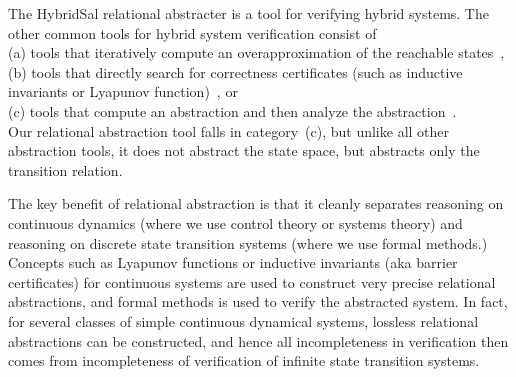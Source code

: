 \documentclass{llncs}
\begin{document}
The HybridSal relational abstracter is a tool for verifying
hybrid systems.  The other common tools for hybrid
system verification consist of 
\\
(a) tools that iteratively compute
an overapproximation of the reachable states~\cite{SpaceExsmall},
\\
(b) tools that directly search for correctness certificates
(such as inductive invariants or Lyapunov function)~\cite{sostools,ST11:ISSACsmall},
or
\\
(c) tools that compute an abstraction and then analyze
the abstraction~\cite{HybridSALsmall,AlurDangIvancic03:TACASsmall,Clarke03:TACASsmall}.
\\
Our relational abstraction tool falls in category~(c), but unlike all
other abstraction tools, it does
not abstract the state space, but abstracts only the transition relation.
 
The key benefit of relational abstraction
is that it cleanly separates reasoning on continuous
dynamics (where we use control theory or systems theory)
and
reasoning on discrete state transition systems (where we use 
formal methods.)
Concepts such as Lyapunov functions or inductive invariants
(aka barrier certificates) for continuous systems are used
to construct very precise relational abstractions, and
formal methods is used to verify the abstracted system.
In fact, for several classes of simple continuous dynamical systems, 
lossless relational abstractions can be constructed, and hence
all incompleteness in verification then comes from incompleteness
of verification of infinite state transition systems. %

\end{document}
